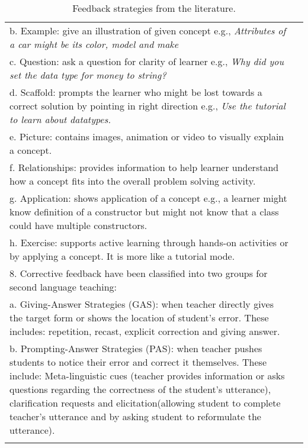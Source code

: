 \begin{longtable}{ | m{30em} | m{2cm}|  }
b. Example: give an illustration of given concept e.g., \emph{Attributes of a car might be its color, model and make} & \\
c. Question: ask a question for clarity of learner e.g., \emph{Why did you set the data type for money to string?} & \\
d. Scaffold: prompts the learner who might be lost towards a correct solution by pointing in right direction e.g., \emph{Use the tutorial to learn about datatypes.} & \\
e. Picture: contains images, animation or video to visually explain a concept. & \\
f. Relationships: provides information to help learner understand how a concept fits into the overall problem solving activity. & \\
g. Application: shows application of a concept e.g., a learner might know definition of a constructor but might not know that a class could have multiple constructors. & \\
h. Exercise: supports active learning through hands-on activities or by applying a concept. It is more like a tutorial mode. & \\
\hline
8. Corrective feedback have been classified into two groups for second language teaching: & \parencite{ferreira2007study} \\
a. Giving-Answer Strategies (GAS): when teacher directly gives the target form or shows the location of student's error. These includes: repetition, recast, explicit correction and giving answer. &\\
b. Prompting-Answer Strategies (PAS): when teacher pushes students to notice their error and correct it themselves. These include: Meta-linguistic cues (teacher provides information or asks questions regarding the correctness of the student's utterance), clarification requests and elicitation(allowing student to complete teacher's utterance and by asking student to reformulate the utterance). & \\
\hline
\caption[Feedback strategies from the literature]{Feedback strategies from the literature.}
\label{tab:tab_2-1}

\end{longtable}

